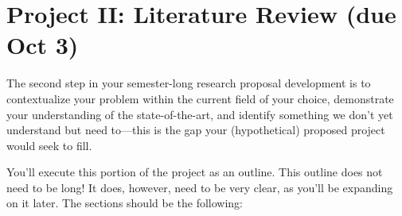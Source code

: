 \section*{Project II: Literature Review (due Oct 3)}

The second step in your semester-long research proposal development is to contextualize your problem within the current field of your choice, demonstrate your understanding of the state-of-the-art, and identify something we don't yet understand but need to---this is the gap your (hypothetical) proposed project would seek to fill.

You'll execute this portion of the project as an outline. 
This outline does not need to be long! 
It does, however, need to be very clear, as you'll be expanding on it later. 
The sections should be the following:


